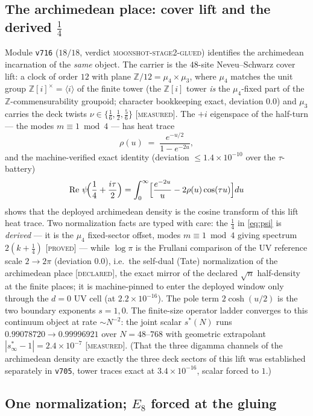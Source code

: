 \documentclass[11pt,a4paper]{article}
\theoremstyle{remark}
\newcommand{\Z}{\mathbb Z}
\DeclareMathOperator{\Rey}{Re}
\newcommand{\PROVED}{\textnormal{[\textsc{proved}]}}
\newcommand{\MEASURED}{\textnormal{[\textsc{measured}]}}
\newcommand{\DECLARED}{\textnormal{[\textsc{declared}]}}
\begin{document}
\subsection{The archimedean place: cover lift and the derived
\texorpdfstring{$\tfrac14$}{1/4}}\label{sec:arch}

Module \texttt{v716} ($18/18$, verdict
\textsc{moonshot-stage2-glued}) identifies the archimedean
incarnation of the \emph{same} object.  The carrier is the $48$-site
Neveu--Schwarz cover lift: a clock of order $12$ with plane
$\Z/12=\mu_4\times\mu_3$, where $\mu_4$ matches the unit group
$\Z[i]^\times=\langle i\rangle$ of the finite tower (the $\Z[i]$
tower \emph{is} the $\mu_4$-fixed part of the $\Z$-commensurability
groupoid; character bookkeeping exact, deviation $0.0$) and $\mu_3$
carries the deck twists $\nu\in\{\tfrac16,\tfrac12,\tfrac56\}$
\MEASURED.  The $+i$ eigenspace of the half-turn --- the modes
$m\equiv1\bmod4$ --- has heat trace
\[
\rho(u)\;=\;\frac{e^{-u/2}}{1-e^{-2u}},
\]
and the machine-verified exact identity (deviation
$\le1.4\times10^{-10}$ over the $\tau$-battery)
\begin{equation}\label{eq:psi}
\Rey\,\psi\!\Bigl(\frac14+\frac{i\tau}{2}\Bigr)
=\int_0^\infty\Bigl[\frac{e^{-2u}}{u}-2\rho(u)\cos(\tau u)\Bigr]du
\end{equation}
shows that the deployed archimedean density is the cosine transform
of this lift heat trace.  Two normalization facts are typed with
care: the $\tfrac14$ in \eqref{eq:psi} is \emph{derived} --- it is
the $\mu_4$ fixed-sector offset, modes $m\equiv1\bmod4$ giving
spectrum $2(k+\tfrac14)$ \PROVED{} --- while $\log\pi$ is the
Frullani comparison of the UV reference scale $2\to2\pi$ (deviation
$0.0$), i.e.\ the self-dual (Tate) normalization of the archimedean
place \DECLARED, the exact mirror of the declared $\sqrt n$
half-density at the finite places; it is machine-pinned to enter the
deployed window only through the $d=0$ UV cell (at
$2.2\times10^{-16}$).  The pole term $2\cosh(u/2)$ is the two
boundary exponents $s=1,0$.  The finite-size operator ladder
converges to this continuum object at rate $\sim N^{-2}$: the joint
scalar $s^*(N)$ runs $0.99078720\to0.99996921$ over $N=48$--$768$
with geometric extrapolant $|s^*_\infty-1|=2.4\times10^{-7}$
\MEASURED.  (That the three digamma channels of the archimedean
density are exactly the three deck sectors of this lift was
established separately in \texttt{v705}, tower traces exact at
$3.4\times10^{-16}$, scalar forced to $1$.)

\subsection{One normalization; \texorpdfstring{$E_8$}{E8} forced at
the gluing}\label{sec:glue}
\end{document}
